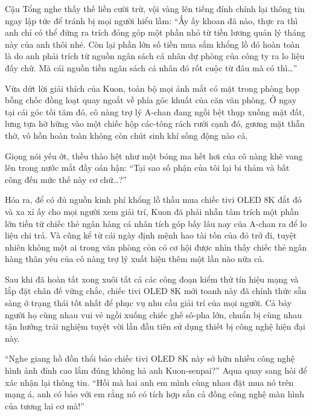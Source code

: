 \documentclass[../main.tex]{subfiles}
\begin{document}
Cậu Tổng nghe thấy thế liền cười trừ, vội vàng lên tiếng đính chính lại thông tin ngay lập tức để tránh bị mọi người hiểu lầm: ``Ấy ấy khoan đã nào, thực ra thì anh chỉ có thể đứng ra trích đóng góp một phần nhỏ từ tiền lương quản lý tháng này của anh thôi nhé. Còn lại phần lớn số tiền mua sắm khổng lồ đó hoàn toàn là do anh phải trích từ nguồn ngân sách cá nhân dự phòng của công ty ra lo liệu đấy chứ. Mà cái nguồn tiền ngân sách cá nhân đó rốt cuộc từ đâu mà có thì\dots''

Vừa dứt lời giải thích của Kuon, toàn bộ mọi ánh mắt có mặt trong phòng họp bỗng chốc đồng loạt quay ngoắt về phía góc khuất của căn văn phòng. Ở ngay tại cái góc tối tăm đó, cô nàng trợ lý A-chan đang ngồi bệt thụp xuống mặt đất, lưng tựa hờ hững vào một chiếc hộp các-tông rách rưới cạnh đó, gương mặt thẫn thờ, vô hồn hoàn toàn không còn chút sinh khí sống động nào cả.

Giọng nói yếu ớt, thều thào hệt như một bóng ma hết hơi của cô nàng khẽ vang lên trong nước mắt đầy oán hận: ``Tại sao số phận của tôi lại bi thảm và bất công đến mức thế này cơ chứ\dots?''

Hóa ra, để có đủ nguồn kinh phí khổng lồ thầu mua chiếc tivi OLED 8K đắt đỏ và xa xỉ ấy cho mọi người xem giải trí, Kuon đã phải nhẫn tâm trích một phần lớn tiền từ chiếc thẻ ngân hàng cá nhân tích góp bấy lâu nay của A-chan ra để lo liệu chi trả. Và cũng kể từ cái ngày định mệnh hao tài tốn của đó trở đi, tuyệt nhiên không một ai trong văn phòng còn có cơ hội được nhìn thấy chiếc thẻ ngân hàng thân yêu của cô nàng trợ lý xuất hiện thêm một lần nào nữa cả.

\omk

Sau khi đã hoàn tất xong xuôi tất cả các công đoạn kiểm thử tín hiệu mạng và lắp đặt chân đế vững chắc, chiếc tivi OLED 8K mới toanh này đã chính thức sẵn sàng ở trạng thái tốt nhất để phục vụ nhu cầu giải trí của mọi người. Cả bảy người họ cùng nhau vui vẻ ngồi xuống chiếc ghế sô-pha lớn, chuẩn bị cùng nhau tận hưởng trải nghiệm tuyệt vời lần đầu tiên sử dụng thiết bị công nghệ hiện đại này.

``Nghe giang hồ đồn thổi bảo chiếc tivi OLED 8K này sở hữu nhiều công nghệ hình ảnh đỉnh cao lắm đúng không hả anh Kuon-senpai?'' Aqua quay sang hỏi để xác nhận lại thông tin. ``Hồi mà hai anh em mình cùng nhau đặt mua nó trên mạng á, anh có bảo với em rằng nó có tích hợp sắn cả đống công nghệ màn hình của tương lai cơ mà!''
\end{document}
